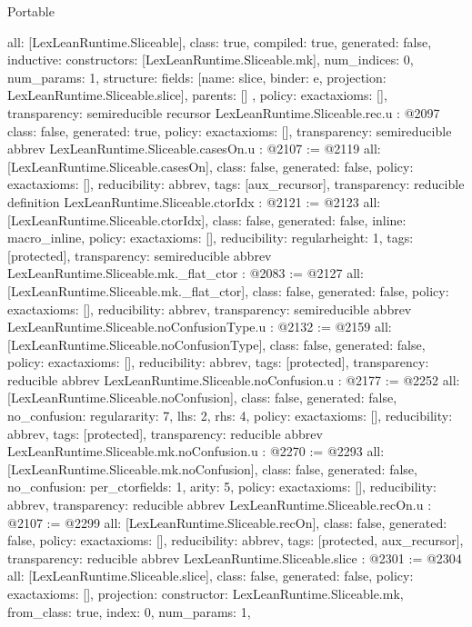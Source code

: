\begin{lexlean}{Portable}
\begin{coremodule}
{  all: [LexLeanRuntime.Sliceable],
  class: true,
  compiled: true,
  generated: false,
  inductive: {
    constructors: [LexLeanRuntime.Sliceable.mk],
    num_indices: 0,
    num_params: 1,
    structure: {
      fields: [{name: slice, binder: e, projection: LexLeanRuntime.Sliceable.slice}],
      parents: []
    }
  },
  policy: exact{axioms: []},
  transparency: semireducible
}
recursor LexLeanRuntime.Sliceable.rec.{u} : @2097 {
  class: false,
  generated: true,
  policy: exact{axioms: []},
  transparency: semireducible
}
abbrev LexLeanRuntime.Sliceable.casesOn.{u} : @2107 := @2119 {
  all: [LexLeanRuntime.Sliceable.casesOn],
  class: false,
  generated: false,
  policy: exact{axioms: []},
  reducibility: abbrev{},
  tags: [aux_recursor],
  transparency: reducible
}
definition LexLeanRuntime.Sliceable.ctorIdx : @2121 := @2123 {
  all: [LexLeanRuntime.Sliceable.ctorIdx],
  class: false,
  generated: false,
  inline: macro_inline,
  policy: exact{axioms: []},
  reducibility: regular{height: 1},
  tags: [protected],
  transparency: semireducible
}
abbrev LexLeanRuntime.Sliceable.mk._flat_ctor : @2083 := @2127 {
  all: [LexLeanRuntime.Sliceable.mk._flat_ctor],
  class: false,
  generated: false,
  policy: exact{axioms: []},
  reducibility: abbrev{},
  transparency: semireducible
}
abbrev LexLeanRuntime.Sliceable.noConfusionType.{u} : @2132 := @2159 {
  all: [LexLeanRuntime.Sliceable.noConfusionType],
  class: false,
  generated: false,
  policy: exact{axioms: []},
  reducibility: abbrev{},
  tags: [protected],
  transparency: reducible
}
abbrev LexLeanRuntime.Sliceable.noConfusion.{u} : @2177 := @2252 {
  all: [LexLeanRuntime.Sliceable.noConfusion],
  class: false,
  generated: false,
  no_confusion: regular{arity: 7, lhs: 2, rhs: 4},
  policy: exact{axioms: []},
  reducibility: abbrev{},
  tags: [protected],
  transparency: reducible
}
abbrev LexLeanRuntime.Sliceable.mk.noConfusion.{u} : @2270 := @2293 {
  all: [LexLeanRuntime.Sliceable.mk.noConfusion],
  class: false,
  generated: false,
  no_confusion: per_ctor{fields: 1, arity: 5},
  policy: exact{axioms: []},
  reducibility: abbrev{},
  transparency: reducible
}
abbrev LexLeanRuntime.Sliceable.recOn.{u} : @2107 := @2299 {
  all: [LexLeanRuntime.Sliceable.recOn],
  class: false,
  generated: false,
  policy: exact{axioms: []},
  reducibility: abbrev{},
  tags: [protected, aux_recursor],
  transparency: reducible
}
abbrev LexLeanRuntime.Sliceable.slice : @2301 := @2304 {
  all: [LexLeanRuntime.Sliceable.slice],
  class: false,
  generated: false,
  policy: exact{axioms: []},
  projection: {constructor: LexLeanRuntime.Sliceable.mk, from_class: true, index: 0, num_params: 1},
}
\end{coremodule}
\end{lexlean}
